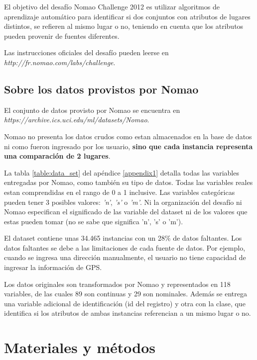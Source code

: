 \documentclass[journal]{IEEEtran}
\begin{document}
El objetivo del desafío Nomao Challenge 2012 es utilizar 
algoritmos de aprendizaje automático para identificar si 
dos conjuntos con atributos de lugares distintos, se refieren al mismo
lugar o no, teniendo en cuenta que los atributos 
pueden provenir de fuentes diferentes.

Las instrucciones oficiales del desafío pueden leerse en 
\textit{http://fr.nomao.com/labs/challenge}.

\subsection{Sobre los datos provistos por Nomao}

El conjunto de datos provisto por Nomao se encuentra en
\textit{https://archive.ics.uci.edu/ml/datasets/Nomao}. 

Nomao no presenta los datos crudos como estan almacenados en la 
base de datos ni como fueron ingresado por los usuario, \textbf{sino que  
cada instancia representa una comparación de 
2 lugares}. 

La tabla \ref{table:data_set} del apéndice \ref{appendix1} 
detalla todas las variables entregadas por 
Nomao, como también su tipo de datos. Todas las variables reales estan comprendidas
en el rango de 0 a 1 inclusive. Las variables
categóricas pueden tener 3 posibles valores: \textit{'n'}, \textit{'s'} 
o \textit{'m'}. Ni la organización del desafío ni Nomao especifican 
el significado de las variable del dataset ni de los valores
que estas pueden tomar (no se sabe que significa 'n', 's' o 'm').

El dataset contiene unas 34.465 instancias con un 28\% de datos faltantes.
Los datos faltantes se debe a las limitaciones de cada fuente de datos. Por
ejemplo, cuando se ingresa una dirección manualmente, el usuario no tiene
capacidad de ingresar la información de GPS.

Los datos originales son transformados por Nomao y representados
en 118 variables, de las cuales 89 son continuas y 29 son
nominales. Además se entrega una variable adicional de identificación 
(id del registro) y
otra con la clase, que identifica si los atributos de ambas 
instancias referencian a un mismo lugar o no. 

\section{Materiales y métodos}
\end{document}

